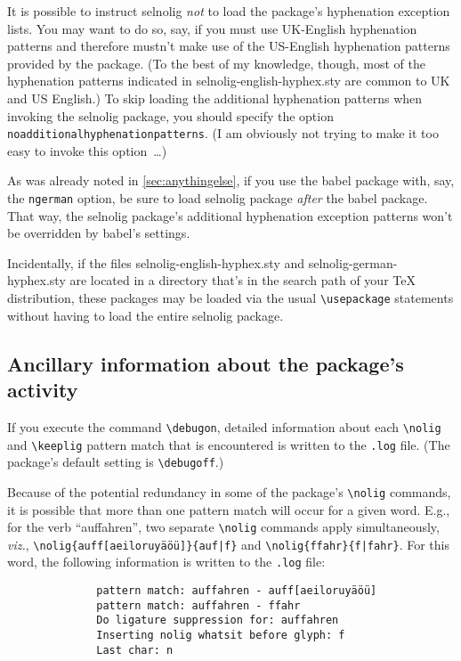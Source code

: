 \documentclass[11pt]{article}
\newcommand{\pkg}[1]{\textsf{#1}}
\newcommand{\opt}[1]{\texttt{#1}}
\newcommand{\cmmd}[1]{\texttt{\textbackslash #1}}
\begin{document}
It is possible to instruct \pkg{selnolig} \emph{not} to load the package's hyphenation exception lists. You may want to do so, say, if you must use UK-English hyphenation patterns and therefore mustn't make use of the US-English hyphenation patterns provided by the package. (To the best of my knowledge, though, most of the hyphenation patterns indicated in \pkg{selnolig-english-hyphex.sty} are common to UK and US English.) To skip loading the additional hyphenation patterns when invoking the \pkg{selnolig} package, you should specify the option \opt{noadditional\-hyphen\-a\-tion\-patterns}. (I am obviously not trying to make it too easy to invoke this option~\dots)

As was already noted in \cref{sec:anythingelse}, if you use the \pkg{babel} package with, say, the \opt{ngerman} option, be sure to load \pkg{selnolig} package \emph{after} the \pkg{babel} package. That way, the \pkg{selnolig} package's additional hyphenation exception patterns won't be overridden by \pkg{babel}'s settings.

Incidentally, if the files \pkg{selnolig-english-hyphex.sty} and \pkg{selnolig-german-hyphex.sty} are located in a directory that's in the search path of your TeX distribution, these packages may be loaded via the usual \cmmd{usepackage} statements without having to load the entire \pkg{selnolig} package.



\subsection{Ancillary information about the package's activity} \label{sec:debugon}

If you execute the command \cmmd{debugon}, detailed information about each \cmmd{nolig} and \cmmd{keeplig} pattern match that is encountered is written to the \opt{.log} file. (The package's default setting is \cmmd{debugoff}.)

Because of the potential redundancy in some of the package's \cmmd{nolig} commands, it is possible that more than one pattern match will occur for a given word. E.g., for the verb \enquote{auffahren}, two separate \cmmd{nolig} commands apply simultaneously, \emph{viz.}, \Verb+\nolig{auff[aeiloruyäöü]}{auf|f}+ and \Verb+\nolig{ffahr}{f|fahr}+. For this word, the following information is written to the \opt{.log} file:
\begin{Verbatim}
              pattern match: auffahren - auff[aeiloruyäöü]
              pattern match: auffahren - ffahr
              Do ligature suppression for: auffahren
              Inserting nolig whatsit before glyph: f
              Last char: n
\end{Verbatim}
\end{document}
